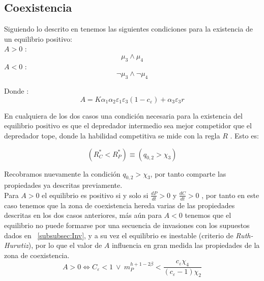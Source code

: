 \subsection{Coexistencia}
Siguiendo lo descrito en \cite{holt1997theoretical} tenemos las siguientes condiciones para la existencia de un equilibrio positivo:\\
$A >0$ :
\begin{equation}
  \mu_3 \land \mu_4
\end{equation}
$A <0$ :
\begin{equation}
  \lnot \mu_3 \land \lnot \mu_4
\end{equation}
 
Donde :
\begin{equation}
  A = K \alpha_1 \alpha_2 \varepsilon_1 \varepsilon_3(1-c_\varepsilon) + \alpha_3\varepsilon_3 r
\end{equation}

En cualquiera de los dos casos una condici\'on necesaria para la existencia del equilibrio positivo es que el depredador intermedio sea mejor competidor que el depredador tope, donde la habilidad competitiva se mide con la regla $R$ \citep{holt1997theoretical,Tilman1990}. Esto es:

\begin{equation}
  (R^*_C < R^*_P) \equiv (q_{0,2} > \chi_3)
\end{equation}

Recobramos nuevamente la condici\'on $q_{0,2} > \chi_3$, por tanto comparte las propiedades ya descritas previamente. \\


Para $A>0$ el equilibrio es positivo si y solo si $\frac{dP}{dt} >0 $ y $\frac{dC}{dt} >0$ , por tanto en este caso tenemos que la zona de coexistencia hereda varias de las propiedades descritas en los dos casos anteriores, m\'as a\'un para $A < 0$ tenemos que el equilibrio no puede formarse por una secuencia de invasiones con los supuestos dados en ~\ref{subsubsec:Inv}, y a su vez el equilibrio es inestable (criterio de \emph{Ruth-Hurwtiz}\citep{holt1997theoretical}), por lo que el valor de $A$ influencia en gran medida las propiedades de la zona de coexistencia.\\


\begin{equation}
  A > 0 \iff C_\varepsilon < 1 \  \lor \  m_P^{h + 1 - 2\beta} < \frac{c_\varepsilon \chi_4}{(c_\varepsilon - 1) \chi_2}
\end{equation}

